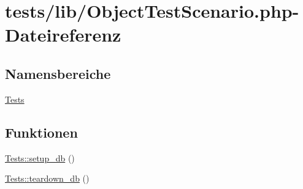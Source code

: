 \hypertarget{ObjectTestScenario_8php}{}\section{tests/lib/\+Object\+Test\+Scenario.php-\/\+Dateireferenz}
\label{ObjectTestScenario_8php}
\subsection*{Namensbereiche}
\begin{DoxyCompactItemize}
\item 
 \hyperlink{namespaceTests}{Tests}
\end{DoxyCompactItemize}
\subsection*{Funktionen}
\begin{DoxyCompactItemize}
\item 
\hyperlink{namespaceTests_af1490090c5c6dcb917b017ff2f255e32}{Tests\+::setup\+\_\+db} ()
\item 
\hyperlink{namespaceTests_a8d90baec1c93ea313cd6148aa0e999f8}{Tests\+::teardown\+\_\+db} ()
\end{DoxyCompactItemize}
